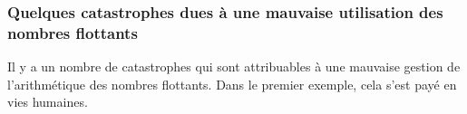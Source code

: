 \documentclass{magnoliaold}
\begin{document}




\subsubsection{Quelques catastrophes dues à une mauvaise utilisation des nombres flottants}

Il y a un nombre de catastrophes qui sont
attribuables à une mauvaise gestion de l'arithmétique des nombres flottants.
Dans le premier exemple, cela s'est payé en vies humaines.
\end{document}
